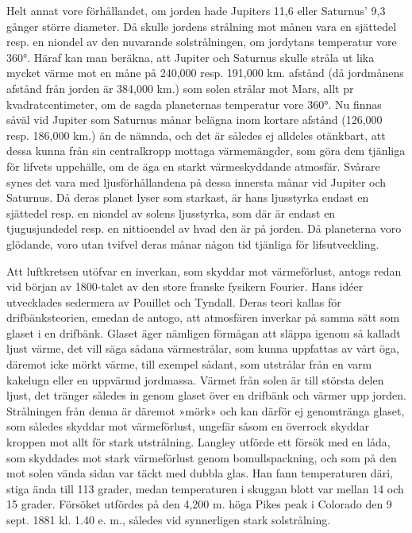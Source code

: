 \documentclass[a4paper, 12pt, oneside, swedish]{article}
\begin{document}
Helt annat vore förhållandet, om jorden hade Jupiters 11,6 eller Saturnus' 9,3 gånger större diameter. Då skulle jordens strålning mot månen vara en sjättedel resp. en niondel av den nuvarande solstrålningen, om jordytans temperatur vore 360°. Häraf kan man beräkna, att Jupiter och Saturnus skulle stråla ut lika mycket värme mot en måne på 240,000 resp. 191,000 km. afstånd (då jordmånens afstånd från jorden är 384,000 km.) som solen strålar mot Mars, allt pr kvadratcentimeter, om de sagda planeternas temperatur vore 360°. Nu finnas såväl vid Jupiter som Saturnus månar belägna inom kortare afstånd (126,000 resp. 186,000 km.) än de nämnda, och det är således ej alldeles otänkbart, att dessa kunna från sin centralkropp mottaga värmemängder, som göra dem tjänliga för lifvets uppehälle, om de äga en starkt värmeskyddande atmosfär. Svårare synes det vara med ljusförhållandena på dessa innersta månar vid Jupiter och Saturnus. Då deras planet lyser som starkast, är hans ljusstyrka endast en sjättedel resp. en niondel av solens ljusstyrka, som där är endast en tjugusjundedel resp. en nittioendel av hvad den är på jorden. Då planeterna voro glödande, voro utan tvifvel deras månar någon tid tjänliga för lifsutveckling.

Att luftkretsen utöfvar en inverkan, som skyddar mot värmeförlust, antogs redan vid början av 1800-talet av den store franske fysikern Fourier. Hans idéer utvecklades sedermera av Pouillet och Tyndall. Deras teori kallas för drifbänksteorien, emedan de antogo, att atmosfären inverkar på samma sätt som glaset i en drifbänk. Glaset äger nämligen förmågan att släppa igenom så kalladt ljust värme, det vill säga sådana värmestrålar, som kunna uppfattas av vårt öga, däremot icke mörkt värme, till exempel sådant, som utstrålar från en varm kakelugn eller en uppvärmd jordmassa. Värmet från solen är till största delen ljust, det tränger således in genom glaset över en drifbänk och värmer upp jorden. Strålningen från denna är däremot »mörk» och kan därför ej genomtränga glaset, som således skyddar mot värmeförlust, ungefär såsom en överrock skyddar kroppen mot allt för stark utstrålning. Langley utförde ett försök med en låda, som skyddades mot stark värmeförlust genom bomullspackning, och som på den mot solen vända sidan var täckt med dubbla glas. Han fann temperaturen däri, stiga ända till 113 grader, medan temperaturen i skuggan blott var mellan 14 och 15 grader. Försöket utfördes på den 4,200 m. höga Pikes peak i Colorado den 9 sept. 1881 kl. 1.40 e. m., således vid synnerligen stark solstrålning.
\end{document}
